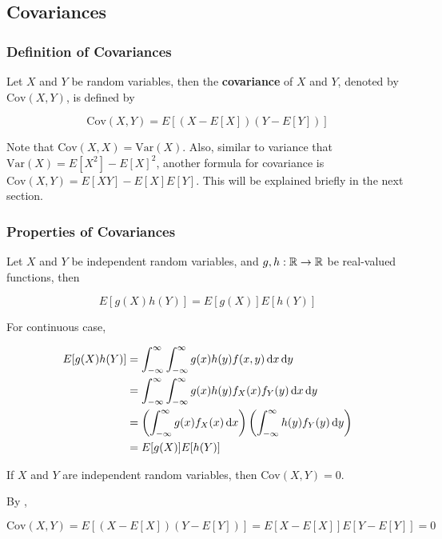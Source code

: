 \documentclass[a4paper,12pt]{article}
\begin{document}
\subsection{Covariances}
\subsubsection{Definition of Covariances}
\begin{dft}
  Let $X$ and $Y$ be random variables, then the \textbf{covariance} of $X$ and $Y$, denoted by $\mathrm{Cov}(X,Y)$, is defined by

  $$\mathrm{Cov}(X,Y)=E[(X-E[X])(Y-E[Y])]$$
\end{dft}\n

Note that $\mathrm{Cov}(X,X)=\mathrm{Var}(X)$. Also, similar to variance that $\mathrm{Var}(X)=E[X^{2}]-E[X]^{2}$, another formula for covariance is $\mathrm{Cov}(X,Y)=E[XY]-E[X]E[Y]$. This will be explained briefly in the next section.

\subsubsection{Properties of Covariances}
\begin{pst}
  Let $X$ and $Y$ be independent random variables, and $g,h:\mathbb{R}\to\mathbb{R}$ be real-valued functions, then

  $$E[g(X)h(Y)]=E[g(X)]E[h(Y)]$$\s

  \prf For continuous case,

  $$\begin{aligned}[t]
    E[g(X)h(Y)]&=\int_{-\infty}^{\infty}\int_{-\infty}^{\infty}g(x)h(y)f(x,y)\,\mathrm{d} x\,\mathrm{d} y\\
    &=\int_{-\infty}^{\infty}\int_{-\infty}^{\infty}g(x)h(y)f_{X}(x)f_{Y}(y)\,\mathrm{d} x\,\mathrm{d} y\\
    &=\left( \int_{-\infty}^{\infty}g(x)f_{X}(x)\,\mathrm{d} x\right)\left( \int_{-\infty}^{\infty}h(y)f_{Y}(y)\,\mathrm{d} y\right)\\
    &=E[g(X)]E[h(Y)]
  \end{aligned}$$
\end{pst}\n

\begin{crl}
  If $X$ and $Y$ are independent random variables, then $\mathrm{Cov}(X,Y)=0$.\n

  \prf By \rpst[\sctr{0}],

  $$\mathrm{Cov}(X,Y)=E[(X-E[X])(Y-E[Y])]=E[X-E[X]]E[Y-E[Y]]=0$$
\end{crl}\n
\end{document}
